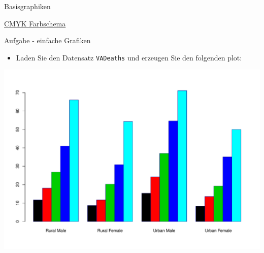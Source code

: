 \documentclass[ignorenonframetext,]{beamer}
\providecommand{\tightlist}{%
\setlength{\itemsep}{0pt}\setlength{\parskip}{0pt}}
\begin{document}
\begin{frame}[fragile]{Basisgraphiken}
\begin{block}{\href{https://www.r-bloggers.com/draw-figures-in-cmyk-mode-in-r/}{CMYK
Farbschema}}
\end{block}

\begin{block}{Aufgabe - einfache Grafiken}

\begin{itemize}
\tightlist
\item
  Laden Sie den Datensatz \texttt{VADeaths} und erzeugen Sie den
  folgenden plot:
\end{itemize}

\includegraphics{R_intern_files/figure-beamer/unnamed-chunk-172-1.pdf}

\end{block}

\end{frame}
\end{document}
